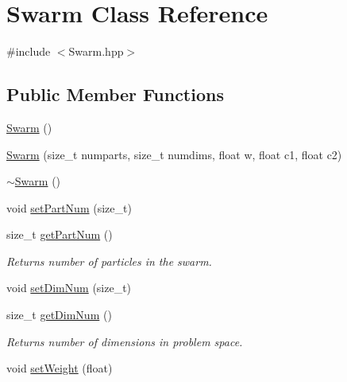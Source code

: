 \hypertarget{class_swarm}{}\section{Swarm Class Reference}
\label{class_swarm}


{\ttfamily \#include $<$Swarm.\+hpp$>$}

\subsection*{Public Member Functions}
\begin{DoxyCompactItemize}
\item 
\mbox{\hyperlink{class_swarm_a35a9ddd3e07819b46badca515be25e6d}{Swarm}} ()
\item 
\mbox{\hyperlink{class_swarm_a1b01d9f7d5730111670d94a368e74dd8}{Swarm}} (size\+\_\+t numparts, size\+\_\+t numdims, float w, float c1, float c2)
\item 
\mbox{\hyperlink{class_swarm_a5d74bf7e768edf0d8930ba187005a583}{$\sim$\+Swarm}} ()
\item 
void \mbox{\hyperlink{class_swarm_a94c68335146f6eaa39bc7648236ccc61}{set\+Part\+Num}} (size\+\_\+t)
\item 
\mbox{\label{class_swarm_adf953ad641a07016444604070d3f87af}} 
size\+\_\+t \mbox{\hyperlink{class_swarm_adf953ad641a07016444604070d3f87af}{get\+Part\+Num}} ()
\begin{DoxyCompactList}\small\item\em Returns number of particles in the swarm. \end{DoxyCompactList}\item 
void \mbox{\hyperlink{class_swarm_ad8214af418b80dc9a6f2d72ce2aeb5d4}{set\+Dim\+Num}} (size\+\_\+t)
\item 
\mbox{\label{class_swarm_a67216923375508354de94e35f4ceca8f}} 
size\+\_\+t \mbox{\hyperlink{class_swarm_a67216923375508354de94e35f4ceca8f}{get\+Dim\+Num}} ()
\begin{DoxyCompactList}\small\item\em Returns number of dimensions in problem space. \end{DoxyCompactList}\item 
\mbox{\label{class_swarm_ab899e656cc249d574c203baf550d5539}} 
void \mbox{\hyperlink{class_swarm_ab899e656cc249d574c203baf550d5539}{set\+Weight}} (float)

\end{DoxyCompactItemize}

